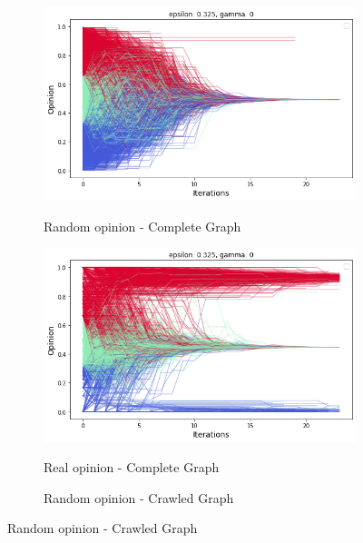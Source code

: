     \begin{figure}[ht]
        \centering
        \begin{subfigure}{.4\textwidth}
            \caption{Random opinion - Complete Graph}
            \includegraphics[scale=.25]{Opinion dynamics/random_complete_0_032.png}
            \label{fig:rdm_cmpl_0_032}
        \end{subfigure}
        \centering
        \begin{subfigure}{.4\textwidth}
            \caption{Real opinion - Complete Graph}
            \includegraphics[scale=.25] {Opinion dynamics/real_complete_0_032.png}
            \label{fig:real_cmpl_0_032}
        \end{subfigure}
        \centering
        \begin{subfigure}{.4\textwidth}
            \caption{Random opinion - Crawled Graph}

\end{subfigure}
\end{figure}

